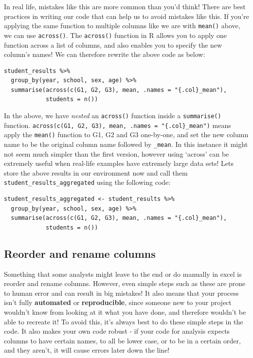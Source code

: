 \documentclass[
  12pt,
]{article}
\begin{document}
In real life, mistakes like this are more common than you'd think! There
are best practices in writing our code that can help us to avoid
mistakes like this. If you're applying the same function to multiple
columns like we are with \texttt{mean()} above, we can use
\texttt{across()}. The \texttt{across()} function in R allows you to
apply one function across a list of columns, and also enables you to
specify the new column's names! We can therefore rewrite the above code
as below:

\begin{verbatim}
student_results %>%
  group_by(year, school, sex, age) %>%
  summarise(across(c(G1, G2, G3), mean, .names = "{.col}_mean"), 
            students = n())
\end{verbatim}

In the above, we have \emph{nested} an \texttt{across()} function inside
a \texttt{summarise()} function.
\texttt{across(c(G1,\ G2,\ G3),\ mean,\ .names\ =\ "\{.col\}\_mean")}
means apply the \texttt{mean()} function to G1, G2 and G3 one-by-one,
and set the new column name to be the original column name followed by
\texttt{\_mean}. In this instance it might not seem much simpler than
the first version, however using `across' can be extremely useful when
real-life examples have extremely large data sets! Lets store the above
results in our environment now and call them
\texttt{student\_results\_aggregated} using the following code:

\begin{verbatim}
student_results_aggregated <- student_results %>%
  group_by(year, school, sex, age) %>%
  summarise(across(c(G1, G2, G3), mean, .names = "{.col}_mean"), 
            students = n())
\end{verbatim}

\hypertarget{reorder-and-rename-columns}{%
\subsection{Reorder and rename
columns}\label{reorder-and-rename-columns}}

Something that some analysts might leave to the end or do manually in
excel is reorder and rename columns. However, even simple steps such as
these are prone to human error and can result in big mistakes! It also
means that your process isn't fully \textbf{automated} or
\textbf{reproducible}, since someone new to your project wouldn't know
from looking at it what you have done, and therefore wouldn't be able to
recreate it! To avoid this, it's always best to do these simple steps in
the code. It also makes your own code robust - if your code for analysis
expects columns to have certain names, to all be lower case, or to be in
a certain order, and they aren't, it will cause errors later down the
line!
\end{document}

